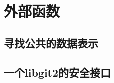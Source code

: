\chapter{外部函数}\label{ch23}

\section{寻找公共的数据表示}\label{repr}

\section{}

\section{一个libgit2的安全接口}\label{SafeInter}